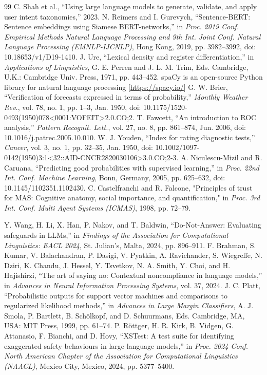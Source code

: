 \documentclass[conference]{IEEEtran}
\begin{document}
\begin{thebibliography}{99}
 C. Shah et al., ``Using large language models to generate, validate, and apply user intent taxonomies,'' 2023.
 N. Reimers and I. Gurevych, ``Sentence-BERT: Sentence embeddings using Siamese BERT-networks,'' in \textit{Proc. 2019 Conf. Empirical Methods Natural Language Processing and 9th Int. Joint Conf. Natural Language Processing (EMNLP-IJCNLP)}, Hong Kong, 2019, pp. 3982–3992, doi: 10.18653/v1/D19-1410.
 J. Ure, ``Lexical density and register differentiation,'' in \textit{Applications of Linguistics}, G. E. Perren and J. L. M. Trim, Eds. Cambridge, U.K.: Cambridge Univ. Press, 1971, pp. 443–452.
 spaCy is an open-source Python library for natural language processing [\url{https://spacy.io/}]
 G. W. Brier, ``Verification of forecasts expressed in terms of probability,'' \textit{Monthly Weather Rev.}, vol. 78, no. 1, pp. 1–3, Jan. 1950, doi: 10.1175/1520-0493(1950)078<0001:VOFEIT>2.0.CO;2.
 T. Fawcett, ``An introduction to ROC analysis,'' \textit{Pattern Recognit. Lett.}, vol. 27, no. 8, pp. 861–874, Jun. 2006, doi: 10.1016/j.patrec.2005.10.010.
 W. J. Youden, ``Index for rating diagnostic tests,'' \textit{Cancer}, vol. 3, no. 1, pp. 32–35, Jan. 1950, doi: 10.1002/1097-0142(1950)3:1<32::AID-CNCR2820030106>3.0.CO;2-3.
 A. Niculescu-Mizil and R. Caruana, ``Predicting good probabilities with supervised learning,'' in \textit{Proc. 22nd Int. Conf. Machine Learning}, Bonn, Germany, 2005, pp. 625–632, doi: 10.1145/1102351.1102430.
 C. Castelfranchi and R. Falcone, "Principles of trust for MAS: Cognitive anatomy, social importance, and quantification," in \textit {Proc. 3rd Int. Conf. Multi Agent Systems (ICMAS)}, 1998, pp. 72–79.

 Y. Wang, H. Li, X. Han, P. Nakov, and T. Baldwin, ``Do-Not-Answer: Evaluating safeguards in LLMs,'' in \textit{Findings of the Association for Computational Linguistics: EACL 2024}, St. Julian's, Malta, 2024, pp. 896--911.
 F. Brahman, S. Kumar, V. Balachandran, P. Dasigi, V. Pyatkin, A. Ravichander, S. Wiegreffe, N. Dziri, K. Chandu, J. Hessel, Y. Tsvetkov, N. A. Smith, Y. Choi, and H. Hajishirzi, ``The art of saying no: Contextual noncompliance in language models,'' in \textit{Advances in Neural Information Processing Systems}, vol. 37, 2024.
 J. C. Platt, ``Probabilistic outputs for support vector machines and comparisons to regularized likelihood methods,'' in \textit{Advances in Large Margin Classifiers}, A. J. Smola, P. Bartlett, B. Sch\"olkopf, and D. Schuurmans, Eds. Cambridge, MA, USA: MIT Press, 1999, pp. 61--74.
 P. R\"ottger, H. R. Kirk, B. Vidgen, G. Attanasio, F. Bianchi, and D. Hovy, ``XSTest: A test suite for identifying exaggerated safety behaviours in large language models,'' in \textit{Proc. 2024 Conf. North American Chapter of the Association for Computational Linguistics (NAACL)}, Mexico City, Mexico, 2024, pp. 5377--5400.
\end{thebibliography}
\end{document}
